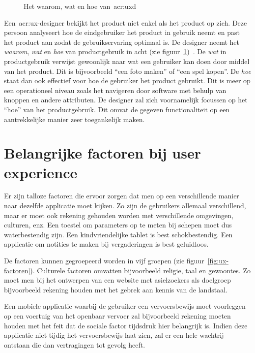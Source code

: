 \begin{figure}[h]
    \centering
    \def\svgwidth{.8\columnwidth}
    
    \caption{Het waarom, wat en hoe van~\acrlong{acr:uxd}}
    \label{fig:ux-waarom-wat-hoe}
\end{figure}

Een~\acrshort{acr:ux}-designer bekijkt het product niet enkel als het product op zich. Deze persoon analyseert hoe de eindgebruiker het product in gebruik neemt en past het product aan zodat de gebruikservaring optimaal is. De designer neemt het \textit{waarom}, \textit{wat} en \textit{hoe} van productgebruik in acht (zie figuur~\ref{fig:ux-waarom-wat-hoe})~\autocite{Hassenzahl2013}. De \textit{wat} in productgebruik verwijst gewoonlijk naar wat een gebruiker kan doen door middel van het product. Dit is bijvoorbeeld ``een foto maken'' of ``een spel kopen''. De \textit{hoe} staat dan ook effectief voor hoe de gebruiker het product gebruikt. Dit is meer op een operationeel niveau zoals het navigeren door software met behulp van knoppen en andere attributen. De designer zal zich voornamelijk focussen op het ``hoe'' van het productgebruik. Dit omvat de gegeven functionaliteit op een aantrekkelijke manier zeer toegankelijk maken.

\section{Belangrijke factoren bij user experience}
\label{sec:belangrijke-factoren-bij-user-experience}

Er zijn talloze factoren die ervoor zorgen dat men op een verschillende manier naar dezelfde applicatie moet kijken. Zo zijn de gebruikers allemaal verschillend, maar er moet ook rekening gehouden worden met verschillende omgevingen, culturen, enz. Een toestel om parameters op te meten bij schepen moet dus waterbestendig zijn. Een kindvriendelijke tablet is best schokbestendig. Een applicatie om notities te maken bij vergaderingen is best geluidloos.

De factoren kunnen gegroepeerd worden in vijf groepen (zie figuur~\ref{fig:ux-factoren}). Culturele factoren omvatten bijvoorbeeld religie, taal en gewoontes. Zo moet men bij het ontwerpen van een website met asielzoekers als doelgroep bijvoorbeeld rekening houden met het gebrek aan kennis van de landstaal.

Een mobiele applicatie waarbij de gebruiker een vervoersbewijs moet voorleggen op een voertuig van het openbaar vervoer zal bijvoorbeeld rekening moeten houden met het feit dat de sociale factor tijdsdruk hier belangrijk is. Indien deze applicatie niet tijdig het vervoersbewijs laat zien, zal er een hele wachtrij ontstaan die dan vertragingen tot gevolg heeft.


